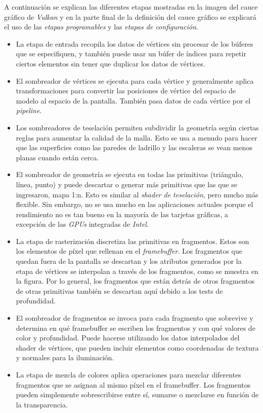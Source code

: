\documentclass[a4paper]{book}
\begin{document}
A continuación se explican las diferentes etapas mostradas en la imagen del cauce gráfico de \textit{Vulkan}
y en la parte final de la definición del cauce gráfico se explicará el uso de las \textit{etapas programables}
y las \textit{etapas de configuración}.

\begin{itemize}
  \item La etapa de entrada recopila los datos de vértices sin procesar de los búferes que
  se especifiquen, y también puede usar un búfer de índices para repetir ciertos elementos sin tener
  que duplicar los datos de vértices.

  \item El sombreador de vértices se ejecuta para cada vértice y generalmente aplica transformaciones
  para convertir las posiciones de vértice del espacio de modelo al espacio de la pantalla. También pasa
  datos de cada vértice por el \textit{pipeline}.

  \item Los sombreadores de teselación permiten subdividir la geometría según ciertas reglas para aumentar
  la calidad de la malla. Esto se usa a menudo para hacer que las superficies como las paredes de ladrillo
  y las escaleras se vean menos planas cuando están cerca.

  \item El sombreador de geometría se ejecuta en todas las primitivas (triángulo, línea, punto) y puede
  descartar o generar más primitivas que las que se ingresaron, mapa 1:n. Esto es similar al \textit{shader de teselación},
  pero mucho más flexible. Sin embargo, no se usa mucho en las aplicaciones actuales porque el rendimiento no es
  tan bueno en la mayoría de las tarjetas gráficas, a excepción de las \textit{GPUs} integradas de \textit{Intel}.

  \item La etapa de rasterización discretiza las primitivas en fragmentos. Estos son los elementos de píxel
  que rellenan en el \textit{framebuffer}. Los fragmentos que quedan fuera de la pantalla se descartan y los atributos
  generados por la etapa de vértices se interpolan a través de los fragmentos, como se muestra en la figura.
  Por lo general, los fragmentos que están detrás de otros fragmentos de otras primitivas también se descartan
  aquí debido a los tests de profundidad.

  \item El sombreador de fragmentos se invoca para cada fragmento que sobrevive y determina en qué framebuffer
  se escriben los fragmentos y con qué valores de color y profundidad. Puede hacerse utilizando los datos interpolados
  del shader de vértices, que pueden incluir elementos como coordenadas de textura y normales para la iluminación.

  \item La etapa de mezcla de colores aplica operaciones para mezclar diferentes fragmentos que se asignan al mismo píxel
  en el framebuffer. Los fragmentos pueden simplemente sobrescribirse entre sí, sumarse o mezclarse en función de la transparencia.

\end{itemize}
\end{document}

